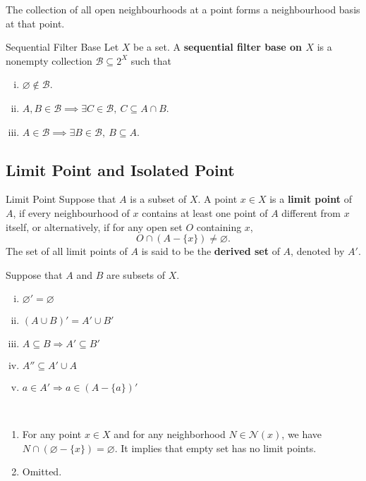 \documentclass{report}
\begin{document}
\begin{proposition}{}{}
	The collection of all open neighbourhoods at a point forms a neighbourhood basis at that point.
\end{proposition}

\begin{definition}{Sequential Filter Base}{}
	Let $X$ be a set. A \textbf{sequential filter base on $X$} is a nonempty collection $\mathcal{B}\subseteq 2^X$ such that
	\begin{enumerate}[(i)]
		\item $\varnothing\notin\mathcal{B}$.
		\item $A,B\in\mathcal{B}\implies \exists C\in\mathcal{B},\ C\subseteq A\cap B$.
		\item $A\in\mathcal{B}\implies \exists B\in\mathcal{B},\ B\subseteq A$.
	\end{enumerate}
\end{definition}

\subsection{Limit Point and Isolated Point}
\begin{definition}{Limit Point}{}
	Suppose that $A$ is a subset of $X$. A point $x\in X$ is a \textbf{limit point} of $A$, if every neighbourhood of $x$ contains at least one point of $A$ different from $x$ itself,
	or alternatively, if for any open set $O$ containing $x$,
	\[
		O\cap(A-\{x\})\ne\varnothing.
	\]
	The set of all limit points of $A$ is said to be the \textbf{derived set} of $A$, denoted by $A'$.
\end{definition}




\begin{proposition}{}{}
	Suppose that $A$ and $B$ are subsets of $X$.
	\begin{enumerate}[(i)]
		\item $\varnothing'=\varnothing$
		\item $(A \cup B)'=A'\cup B' $
		\item $A \subseteq B \Longrightarrow A' \subseteq B'$
		\item $A'' \subseteq A' \cup A $
		\item $a \in A' \Longrightarrow a \in(A-\{a\})' $
	\end{enumerate}
\end{proposition}

\begin{prf}~\\ \vspace{-1em}
	\begin{enumerate}
		\item For any point $x\in X$ and for any neighborhood $N\in\mathcal{N}(x)$, we have $N\cap(\varnothing-\{x\})=\varnothing$. It implies that empty set has no limit points.
		\item Omitted.
	\end{enumerate}
\end{prf}
\end{document}
